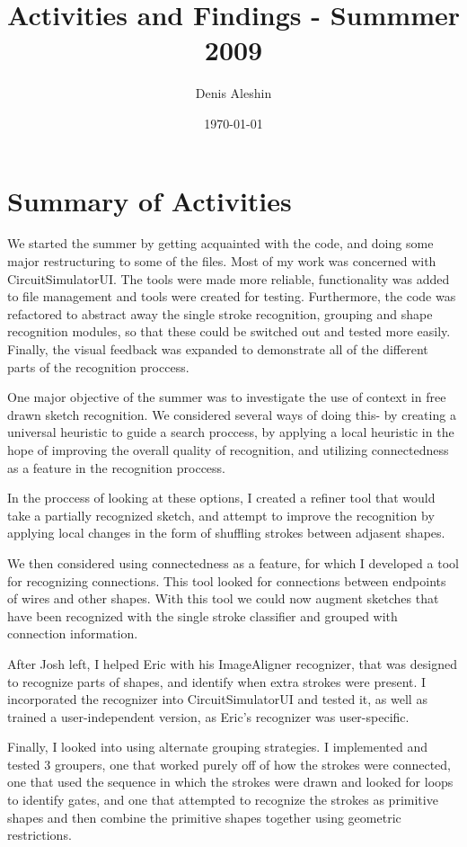 \documentclass{article}
\title{Activities and Findings - Summmer 2009}
\author{Denis Aleshin}
\date{\today}
\begin{document}
\maketitle
\section{Summary of Activities}
We started the summer by getting acquainted with the code, and doing some major restructuring to some of the files. Most of my work was concerned with CircuitSimulatorUI. The tools were made more reliable, functionality was added to file management and tools were created for testing. Furthermore, the code was refactored to abstract away the single stroke recognition, grouping and shape recognition modules, so that these could be switched out and tested more easily. Finally, the visual feedback was expanded to demonstrate all of the different parts of the recognition proccess.

One major objective of the summer was to investigate the use of context in free drawn sketch recognition. We considered several ways of doing this- by creating a universal heuristic to guide a search proccess, by applying a local heuristic in the hope of improving the overall quality of recognition, and utilizing connectedness as a feature in the recognition proccess.

In the proccess of looking at these options, I created a refiner tool that would take a partially recognized sketch, and attempt to improve the recognition by applying local changes in the form of shuffling strokes between adjasent shapes.

We then considered using connectedness as a feature, for which I developed a tool for recognizing connections. This tool looked for connections between endpoints of wires and other shapes. With this tool we could now augment sketches that have been recognized with the single stroke classifier and grouped with connection information.

After Josh left, I helped Eric with his ImageAligner recognizer, that was designed to recognize parts of shapes, and identify when extra strokes were present. I incorporated the recognizer into CircuitSimulatorUI and tested it, as well as trained a user-independent version, as Eric's recognizer was user-specific.

Finally, I looked into using alternate grouping strategies. I implemented and tested 3 groupers, one that worked purely off of how the strokes were connected, one that used the sequence in which the strokes were drawn and looked for loops to identify gates, and one that attempted to recognize the strokes as primitive shapes and then combine the primitive shapes together using geometric restrictions.
\end{document}
